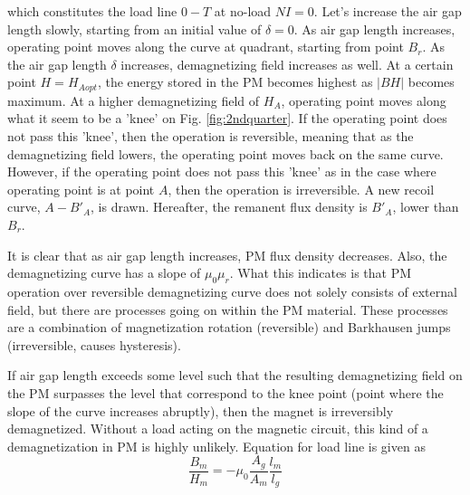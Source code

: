 which constitutes the load line $0-T$ at no-load $NI = 0$. Let's increase the air gap length slowly, starting from an initial value of $\delta = 0$. As air gap length increases, operating point moves along the curve at  quadrant, starting from point $B_{r}$. As the air gap length $\delta$ increases, demagnetizing field increases as well. At a certain point $H = H_{Aopt}$, the energy stored in the PM becomes highest as $|BH|$ becomes maximum. At a higher demagnetizing field of $H_{A}$, operating point moves along what it seem to be a 'knee' on Fig. \ref{fig:2ndquarter}. If the operating point does not pass this 'knee', then the operation is reversible, meaning that as the demagnetizing field lowers, the operating point moves back on the same curve. However, if the operating point does not pass this 'knee' as in the case where operating point is at point $A$, then the operation is irreversible. A new recoil curve, $A-B'_{A}$, is drawn. Hereafter, the remanent flux density is $B'_{A}$, lower than $B_{r}$.



It is clear that as air gap length increases, PM flux density decreases. Also, the demagnetizing curve has a slope of $\mu_{0} \mu_{r}$. What this indicates is that PM operation over reversible demagnetizing curve does not solely consists of external field, but there are processes going on within the PM material. These processes are a combination of magnetization rotation (reversible) and Barkhausen jumps (irreversible, causes hysteresis).

  If air gap length exceeds some level such that the resulting demagnetizing field on the PM surpasses the level that correspond to the knee point (point where the slope of the curve increases abruptly), then the magnet is irreversibly demagnetized. Without a load acting on the magnetic circuit, this kind of a demagnetization in PM is highly unlikely.
  Equation for load line is given as
\begin{equation}
	\frac{B_{m}}{H_{m}} = -\mu_{0} \frac{A_{g}}{A_{m}} \frac{l_{m}}{l_{g}}
\end{equation}


